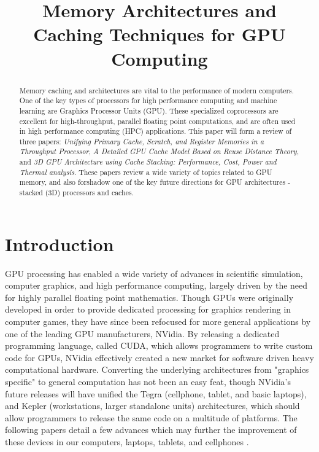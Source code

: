 \documentclass[conference]{IEEEtran}
\begin{document}
%
\title{Memory Architectures and Caching Techniques for GPU Computing}

\author{
}
\maketitle
\begin{abstract}
Memory caching and architectures are vital to the 
performance of modern computers. One of the key types of processors for high
performance computing and machine learning are Graphics Processor Units (GPU).
These specialized coprocessors are excellent for high-throughput, parallel
floating point computations, and are often used in high performance computing
(HPC) applications. This paper will form a review of three papers: 
\emph{Unifying Primary Cache, Scratch, and Register Memories in a Throughput
Processor}, \emph{A Detailed GPU Cache Model Based on Reuse Distance Theory}, 
and \emph{3D GPU Architecture using Cache Stacking: Performance, Cost, Power
and Thermal analysis}. These papers review a wide variety of topics related to
GPU memory, and also forshadow one of the key future directions for GPU
architectures - stacked (3D) processors and caches. 
\end{abstract}
\IEEEpeerreviewmaketitle

\section{Introduction}
GPU processing has enabled a wide variety of advances in scientific simulation,
computer graphics, and high performance computing, largely driven by the need
for highly parallel floating point mathematics. Though GPUs were originally
developed in order to provide dedicated processing for graphics rendering in
computer games, they have since been refocused for more general applications by
one of the leading GPU manufacturers, NVidia. By releasing a dedicated
programming language, called CUDA, which allows programmers to write custom
code for GPUs, NVidia effectively created a new market for software driven 
heavy computational hardware. Converting the underlying architectures from 
"graphics specific" to general computation has not been an easy feat, though 
NVidia's future releases will have unified the Tegra (cellphone, tablet,
and basic laptops), and Kepler (workstations, larger standalone units) 
architectures, which should allow programmers to release the same
code on a multitude of platforms. The following papers detail a few advances
which may further the improvement of these devices in our computers, laptops, 
tablets, and cellphones \cite{gtc}.
\end{document}
